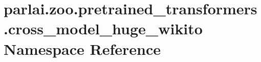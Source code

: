 \hypertarget{namespaceparlai_1_1zoo_1_1pretrained__transformers_1_1cross__model__huge__wikito}{}\section{parlai.\+zoo.\+pretrained\+\_\+transformers.\+cross\+\_\+model\+\_\+huge\+\_\+wikito Namespace Reference}
\label{namespaceparlai_1_1zoo_1_1pretrained__transformers_1_1cross__model__huge__wikito}
